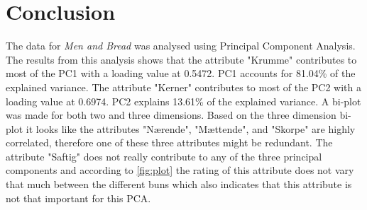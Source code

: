 \section*{Conclusion}
%
The data for \textit{Men and Bread} was analysed using Principal Component Analysis. The results from this analysis shows that the attribute "Krumme" contributes to most of the PC1 with a loading value at 0.5472. PC1 accounts for 81.04\% of the explained variance. The attribute "Kerner" contributes to most of the PC2 with a loading value at 0.6974. PC2 explains 13.61\% of the explained variance. \blankline
%
A bi-plot was made for both two and three dimensions. Based on the three dimension bi-plot it looks like the attributes "Nærende", "Mættende", and "Skorpe" are highly correlated, therefore one of these three attributes might be redundant. \blankline
%
The attribute "Saftig" does not really contribute to any of the three principal components and according to \autoref{fig:plot} the rating of this attribute does not vary that much between the different buns which also indicates that this attribute is not that important for this PCA.